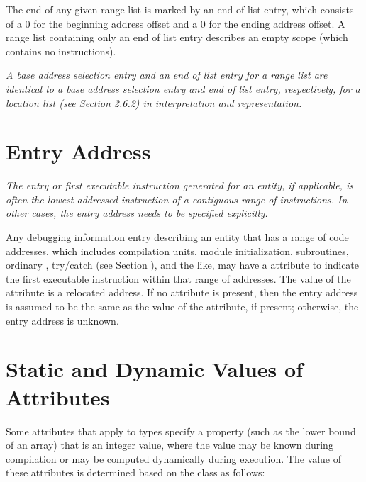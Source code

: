 The end of any given range list is marked by an end of
list entry, which consists of a 0 for the beginning address
offset and a 0 for the ending address offset. A range list
containing only an end of list entry describes an empty scope
(which contains no instructions).

\textit{A base address selection entry and an end of list entry for
a range list are identical to a base address selection entry
and end of list entry, respectively, for a location list
(see Section 2.6.2) in interpretation and representation.}



\section{Entry Address}
\label{chap:entryaddress}
\textit{The entry or first executable instruction generated
for an entity, if applicable, is often the lowest addressed
instruction of a contiguous range of instructions. In other
cases, the entry address needs to be specified explicitly.}

Any debugging information entry describing an entity that has
a range of code addresses, which includes compilation units,
module initialization, subroutines, 
ordinary , 
try/catch  (see Section ),
and the like, 
may have a  attribute to
indicate the first executable instruction within that range
of addresses. The value of the  attribute is a
relocated address. If no  attribute is present,
then the entry address is assumed to be the same as the
value of the  attribute, if present; otherwise,
the entry address is unknown.

\section{Static and Dynamic Values of Attributes}
\label{chap:staticanddynamicvaluesofattributes}

Some attributes that apply to types specify a property (such
as the lower bound of an array) that is an integer value,
where the value may be known during compilation or may be
computed dynamically during execution.  The value of these
attributes is determined based on the class as follows:

